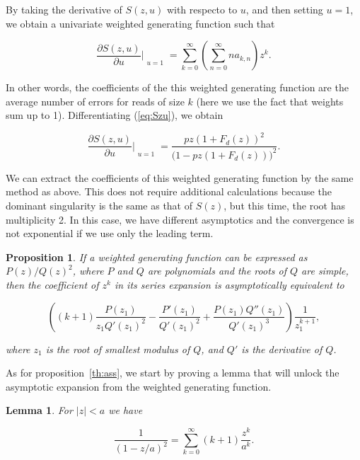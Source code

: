 \documentclass{article}
\newtheorem{lemma}{Lemma}
\newtheorem{proposition}{Proposition}
\begin{document}
By taking the derivative of $S(z,u)$ with respecto to $u$, and then
setting $u=1$, we obtain a univariate weighted generating function such
that

\begin{equation*}
\frac{\partial S(z,u)}{\partial u} \Bigr|_{\substack{\\u=1}} =
\sum_{k=0}^\infty \left( \sum_{n=0}^\infty na_{k,n} \right) z^k.
\end{equation*}

In other words, the coefficients of the this weighted generating function
are the average number of errors for reads of size $k$ (here we use the
fact that weights sum up to 1). Differentiating (\ref{eq:Szu}), we obtain

\begin{equation*}
\frac{\partial S(z,u)}{\partial u} \Bigr|_{\substack{\\u=1}} = 
\frac{pz(1+F_d(z))^2}{\big( 1 - pz(1+F_d(z)) \big)^2}.
\end{equation*}

We can extract the coefficients of this weighted generating function by
the same method as above. This does not require additional calculations
because the dominant singularity is the same as that of $S(z)$, but this
time, the root has multiplicity 2. In this case, we have different
asymptotics and the convergence is not exponential if we use only the
leading term.


\begin{proposition}
\label{th:ass2}
If a weighted generating function can be expressed as $P(z)/Q(z)^2$, where
$P$ and $Q$ are polynomials and the roots of $Q$ are simple, then the
coefficient of $z^k$ in its series expansion is asymptotically equivalent
to

\begin{equation}
\label{eq:ass2}
\left( (k+1)\frac{P(z_1)}{z_1 Q'(z_1)^2} - \frac{P'(z_1)}{Q'(z_1)^2} +
\frac{P(z_1)Q''(z_1)}{Q'(z_1)^3} \right)
\frac{1}{z_1^{k+1}},
\end{equation}

\noindent
where $z_1$ is the root of smallest modulus of $Q$,
and $Q'$ is the derivative of $Q$.
\end{proposition}

As for proposition~\ref{th:ass}, we start by proving a lemma that will
unlock the asymptotic expansion from the weighted generating function.

\begin{lemma}
\label{lemma:poles2}
For $|z| < a$ we have

\begin{equation}
\label{eq:poles2}
\frac{1}{(1-z/a)^2} = \sum_{k=0}^\infty (k+1)\frac{z^k}{a^k}.
\end{equation}
\end{lemma}
\end{document}
